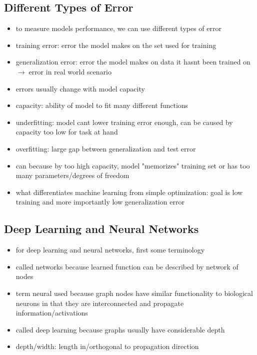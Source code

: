 \documentclass{article}
\newcommand{\arrow}{$\rightarrow\;$}
\begin{document}
\subsection*{Different Types of Error}
\begin{itemize}
    \item to measure models performance, we can use different types of error
    \item training error: error the model makes on the set used for training
    \item generalization error: error the model makes on data it hasnt been trained on \arrow error in real world scenario
    \item errors usually change with model capacity
    \item capacity: ability of model to fit many different functions
    \item underfitting: model cant lower training error enough, can be caused by capacity too low for task at hand
    \item overfitting: large gap between generalization and test error
    \item can because by too high capacity, model "memorizes" training set or has too many parameters/degrees of freedom
    \item what differentiates machine learning from simple optimization: goal is low training and more importantly low generalization error
\end{itemize}

\subsection*{Deep Learning and Neural Networks}
\begin{itemize}
    \item for deep learning and neural networks, first some terminology
    \item called networks because learned function can be described by network of nodes
    \item term neural used because graph nodes have similar functionality to biological neurons in that they are interconnected and propagate information/activations
    \item called deep learning because graphs usually have considerable depth
    \item depth/width: length in/orthogonal to propagation direction
\end{itemize}
\end{document}
